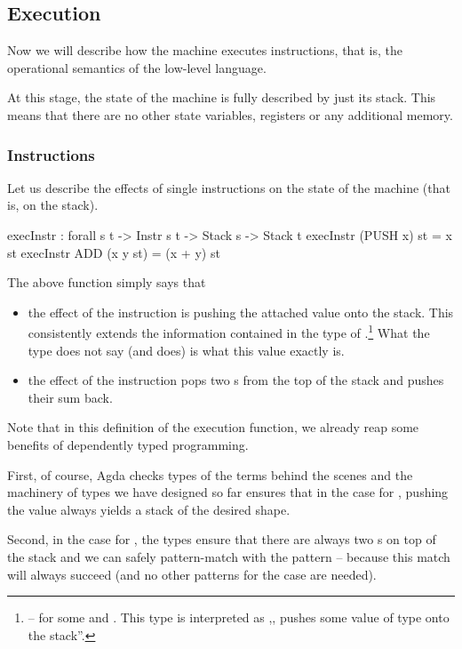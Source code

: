 \subsection{Execution}

Now we will describe how the machine executes instructions, that is,
the operational semantics of the low-level language.

At this stage, the state of the machine is fully described by just its stack. This
means that there are no other state variables, registers or any additional
memory.

\subsubsection{Instructions}

Let us describe the effects of single instructions on the state of the machine
(that is, on the stack).

\begin{code}
  execInstr : forall {s t} -> Instr s t -> Stack s -> Stack t
  execInstr (PUSH x) st = x \scons st
  execInstr ADD (x \scons y \scons st) = (x + y) \scons st
\end{code}

\noindent The above function simply says that
\begin{itemize}
  \item the effect of the instruction  is pushing the attached
    value onto the stack. This consistently extends the information contained
    in the type of .\footnote{ -- for
    some  and . This type is interpreted as ,,
    pushes some value of type  onto the stack''.}
    What the type does not say (and 
    does) is what this value exactly is.
  \item the effect of the instruction  pops two s from
    the top of the stack and pushes their sum back.
\end{itemize}

Note that in this definition of the execution function, we already reap some
benefits of dependently typed programming.

First, of course, Agda checks types of the terms behind
the scenes and the machinery of types we have designed so far ensures that
in the case for , pushing the value  always yields
a stack of the desired shape.

Second, in the case for , the types ensure that there are always two
s on top of the stack and we can safely pattern-match with the
pattern  \scons {} \scons {} -- because this match
will always succeed (and no other patterns for the  case are needed). 

